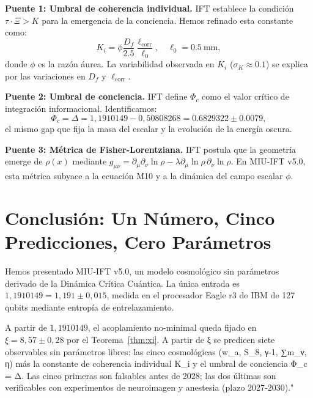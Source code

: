 \documentclass[12pt, a4paper]{article}
\theoremstyle{miuThm}
\theoremstyle{remark}
\newcommand{\qborn}{1{,}1910149}
\newcommand{\qcrit}{0{,}50808268}
\begin{document}
\textbf{Puente 1: Umbral de coherencia individual.}
IFT establece la condición $\tau\cdot\Xi > K$ para la emergencia de la conciencia. Hemos refinado esta constante como:
\begin{equation}
K_i = \phi \frac{D_f}{2.5} \frac{\ell_{\text{corr}}}{\ell_0}, \quad \ell_0 = 0.5\ \text{mm},
\end{equation}
donde $\phi$ es la razón áurea. La variabilidad observada en $K_i$ ($\sigma_K \approx 0.1$) se explica por las variaciones en $D_f$ y $\ell_{\text{corr}}$.

\textbf{Puente 2: Umbral de conciencia.}
IFT define $\Phi_c$ como el valor crítico de integración informacional. Identificamos:
\begin{equation}
\Phi_c = \Delta = \qborn - \qcrit = 0.6829322 \pm 0.0079,
\end{equation}
el mismo gap que fija la masa del escalar y la evolución de la energía oscura.

\textbf{Puente 3: Métrica de Fisher-Lorentziana.}
IFT postula que la geometría emerge de $\rho(x)$ mediante $g_{\mu\nu} = \partial_\mu\partial_\nu\ln\rho - \lambda \partial_\mu\ln\rho\,\partial_\nu\ln\rho$. En MIU-IFT v5.0, esta métrica subyace a la ecuación M10 y a la dinámica del campo escalar $\phi$.

\section{Conclusión: Un Número, Cinco Predicciones, Cero Parámetros}
\label{sec:conclusion}

Hemos presentado MIU-IFT v5.0, un modelo cosmológico sin parámetros derivado de la
Dinámica Crítica Cuántica. La única entrada es $\qborn = 1{,}191 \pm 0{,}015$,
medida en el procesador Eagle r3 de IBM de 127 qubits mediante entropía de
entrelazamiento. 

A partir de $\qborn$, el acoplamiento no-minimal queda fijado en $\xi = 8{,}57 \pm 0{,}28$
por el Teorema~\ref{thm:xi}. A partir de ξ se predicen siete observables sin parámetros libres: las cinco cosmológicas (w_a, S_8, γ-1, ∑m_ν, η) más la constante de coherencia individual K_i y el umbral de conciencia Φ_c = Δ. Las cinco primeras son falsables antes de 2028; las dos últimas son verificables con experimentos de neuroimagen y anestesia (plazo 2027‑2030)."
\end{document}
